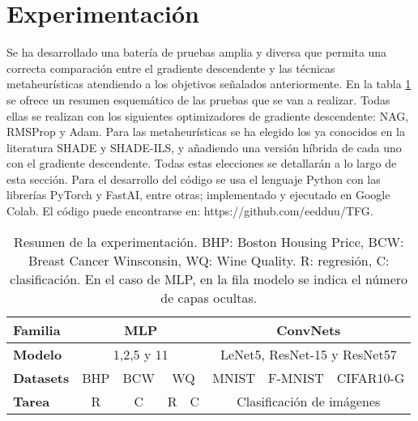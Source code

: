 \section{Experimentación}

Se ha desarrollado una batería de pruebas amplia y diversa que permita una correcta comparación entre el gradiente descendente y las técnicas metaheurísticas atendiendo a los objetivos señalados anteriormente. En la tabla \ref{table:exp} se ofrece un resumen esquemático de las pruebas que se van a realizar. Todas ellas se realizan con los siguientes optimizadores de gradiente descendente: NAG, RMSProp y Adam. Para las metaheurísticas se ha elegido los ya conocidos en la literatura SHADE y SHADE-ILS, y añadiendo una versión híbrida de cada uno con el gradiente descendente. Todas estas elecciones se detallarán a lo largo de esta sección. Para el desarrollo del código se usa el lenguaje Python con las librerías PyTorch y FastAI, entre otras; implementado y ejecutado en Google Colab. El código puede encontrarse en: https://github.com/eedduu/TFG.




\begin{table}[]
\begin{tabular}{|l|cccc|cll|}
\hline
\textbf{Familia} & \multicolumn{4}{c|}{MLP}                                                                                                                               & \multicolumn{3}{c|}{ConvNets}                                         \\ \hline
\textbf{Modelo}  & \multicolumn{4}{c|}{1,2,5 y 11}                                                                                                                        & \multicolumn{3}{c|}{LeNet5, ResNet-15 y ResNet57}                               \\ \hline
\textbf{Datasets}           & \multicolumn{1}{c|}{BHP} & \multicolumn{1}{c|}{BCW} & \multicolumn{2}{c|}{WQ}              & \multicolumn{1}{c|}{MNIST} & \multicolumn{1}{l|}{F-MNIST} & CIFAR10-G \\ \hline
\textbf{Tarea}             & \multicolumn{1}{c|}{R}                        & \multicolumn{1}{c|}{C}            & \multicolumn{1}{c|}{R} & C & \multicolumn{3}{c|}{Clasificación de imágenes}                        \\ \hline
\end{tabular}
\caption{Resumen de la experimentación. BHP: Boston Housing Price, BCW: Breast Cancer Winsconsin, WQ: Wine Quality. R: regresión, C: clasificación. En el caso de MLP, en la fila modelo se indica el número de capas ocultas.}
\label{table:exp}
\end{table}

